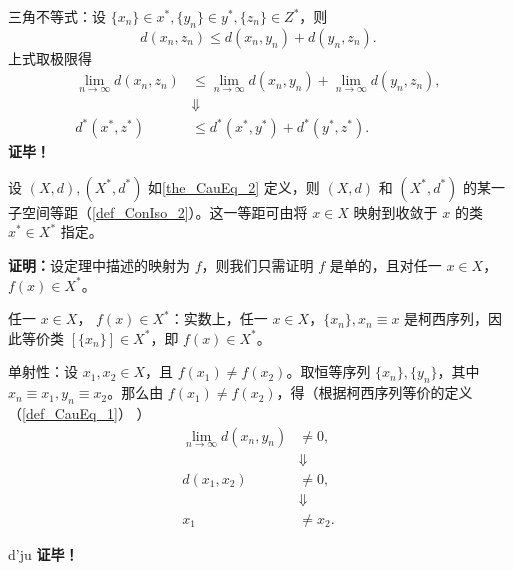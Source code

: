 三角不等式：设 $\{x_n\}\in x^*,\{y_n\}\in y^*,\{z_n\}\in Z^*$，则
\begin{equation}
d(x_n,z_n)\leq d(x_n,y_n)+d(y_n,z_n).~
\end{equation}
上式取极限得
\begin{equation}
\begin{aligned}
\lim_{n\rightarrow\infty}d(x_n,z_n)&\leq \lim_{n\rightarrow\infty}d(x_n,y_n)+\lim_{n\rightarrow\infty}d(y_n,z_n),\\
&\Downarrow\\
d^*(x^*,z^*)&\leq d^*(x^*,y^*)+d^*(y^*,z^*).
\end{aligned}
~
\end{equation}
\textbf{证毕！}

\begin{corollary}{}
设 $(X,d),(X^*,d^*)$ 如\autoref{the_CauEq_2} 定义，则 $(X,d)$ 和 $(X^*,d^*)$ 的某一子空间等距（\autoref{def_ConIso_2}）。这一等距可由将 $x\in X$ 映射到收敛于 $x$ 的类 $x^*\in X^*$ 指定。
\end{corollary}

\textbf{证明：}设定理中描述的映射为 $f$，则我们只需证明 $f$ 是单的，且对任一 $x\in X$， $f(x)\in X^*$。


任一 $x\in X$， $f(x)\in X^*$：实数上，任一 $x\in X$，$\{x_n\},x_n\equiv x$ 是柯西序列，因此等价类 $[\{x_n\}]\in X^*$，即 $f(x)\in X^*$。

单射性：设 $x_1, x_2\in X$，且 $f(x_1)\neq f(x_2)$。取恒等序列 $\{x_n\},\{y_n\}$，其中 $x_n\equiv x_1,y_n\equiv x_2$。那么由 $f(x_1)\neq f(x_2)$，得（根据柯西序列等价的定义（\autoref{def_CauEq_1}） ）
\begin{equation}
\begin{aligned}
\lim_{n\rightarrow\infty}d(x_n,y_n)&\neq 0,\\
&\Downarrow\\
d(x_1,x_2)&\neq0,\\
&\Downarrow\\
x_1&\neq x_2.
\end{aligned}~
\end{equation}

d'ju
\textbf{证毕！}


